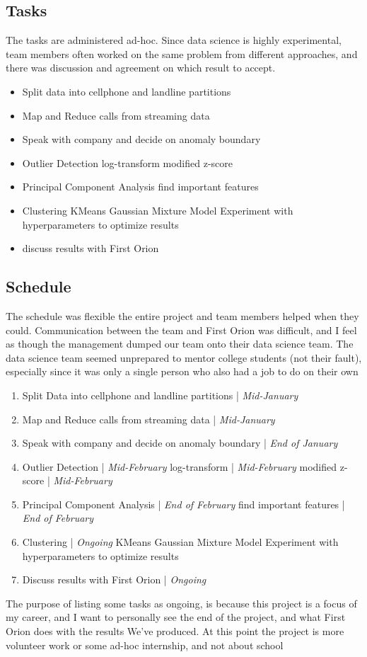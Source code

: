 \documentclass[20pt]{article} %
\begin{document}
\subsection{Tasks}
The tasks are administered ad-hoc.  Since data science is highly experimental, team members often worked on the same problem from different approaches, and there was discussion and agreement on which result to accept.
\begin{itemize}
\item Split data into cellphone and landline partitions
\item Map and Reduce calls from streaming data
\item Speak with company and decide on anomaly boundary
\item Outlier Detection
\subitem log-transform
\subitem modified z-score
\item Principal Component Analysis
\subitem find important features
\item Clustering
\subitem KMeans
\subitem Gaussian Mixture Model
\subitem Experiment with hyperparameters to optimize results
\item discuss results with First Orion
\end{itemize}
\subsection{Schedule}
The schedule was flexible the entire project and team members helped when they could.  Communication between the team and First Orion was difficult, and I feel as though the management dumped our team onto their data science team.  The data science team seemed unprepared to mentor college students (not their fault), especially since it was only a single person who also had a job to do on their own
\begin{enumerate}
\item Split Data into cellphone and landline partitions | \textit{Mid-January}
\item Map and Reduce calls from streaming data | \textit{Mid-January}
\item Speak with company and decide on anomaly boundary | \textit{End of January}
\item Outlier Detection | \textit{Mid-February}
\subitem log-transform | \textit{Mid-February}
\subitem modified z-score | \textit{Mid-February}
\item Principal Component Analysis | \textit{End of February}
\subitem find important features | \textit{End of February}
\item Clustering | \textit{Ongoing}
\subitem KMeans
\subitem Gaussian Mixture Model
\subitem Experiment with hyperparameters to optimize results
\item Discuss results with First Orion | \textit{Ongoing}
\end{enumerate}
The purpose of listing some tasks as ongoing, is because this project is a focus of my career, and I want to personally see the end of the project, and what First Orion does with the results We've produced.  At this point the project is more volunteer work or some ad-hoc internship, and not about school
\end{document}
